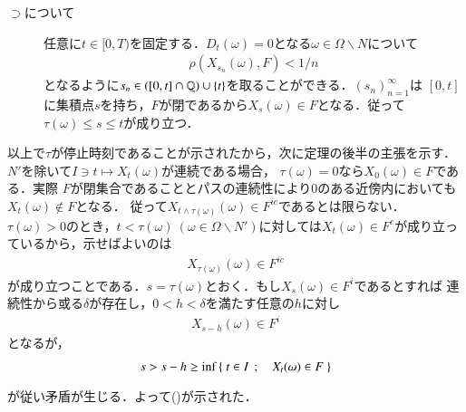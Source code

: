 \begin{prf}
\begin{description}
			\item[$\supset$について]
				任意に$t \in [0,T)$を固定する．$D_t(\omega) = 0$となる$\omega \in \Omega \backslash N$について
				\begin{align}
					\rho(X_{s_n}(\omega),F) < 1/n
				\end{align}
				となるように$s_n \in ([0,t] \cap \mathbb{Q}) \cup \{t\}$を取ることができる．$(s_n)_{n=1}^{\infty}$は
				$[0,t]$に集積点$s$を持ち，$F$が閉であるから$X_s(\omega) \in F$となる．従って
				$\tau(\omega) \leq s \leq t$が成り立つ．
		\end{description}
		以上で$\tau$が停止時刻であることが示されたから，次に定理の後半の主張を示す．
		$N'$を除いて$I \ni t \longmapsto X_t(\omega)$が連続である場合，
		$\tau(\omega) = 0$なら$X_0(\omega) \in F$である．実際
		$F$が閉集合であることとパスの連続性により$0$のある近傍内においても$X_t(\omega) \notin F$となる．
		従って$X_{t \wedge \tau(\omega)}(\omega) \in F^{ic}$であるとは限らない．
		$\tau(\omega) > 0$のとき，$t < \tau(\omega)\ (\omega \in \Omega \backslash N')$に対しては$X_t(\omega) \in F^c$が成り立っているから，示せばよいのは
		\begin{align}
			X_{\tau(\omega)}(\omega) \in F^{ic}
			\label{eq:closed_set_stopping_time_2}
		\end{align}
		が成り立つことである．$s = \tau(\omega)$とおく．もし$X_s(\omega) \in F^i$であるとすれば
		連続性から或る$\delta$が存在し，$0 < h < \delta$を満たす任意の$h$に対し
		\begin{align}
			X_{s - h}(\omega) \in F^i
		\end{align}
		となるが，
		\begin{align}
			s > s - h \geq \operatorname*{inf}_{} \left\{\ t \in I\ \, ; \quad X_t(\omega) \in F\ \right\}
		\end{align}
		が従い矛盾が生じる．よって()が示された．
		\QED
	\end{prf}
	